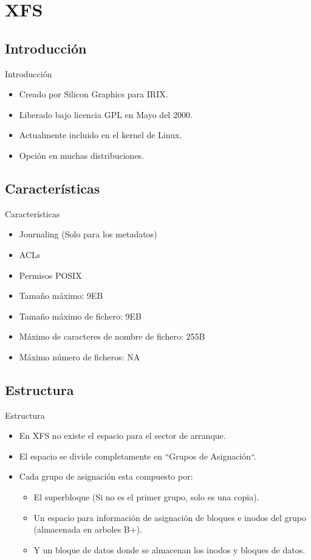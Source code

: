 \section{XFS}
\subsection{Introducción}
\begin{frame}{Introducción}
  \begin{itemize}
    \item Creado por Silicon Graphics para IRIX.
    \item Liberado bajo licencia GPL en Mayo del 2000.
    \item Actualmente incluido en el kernel de Linux.
    \item Opción en muchas distribuciones.
  \end{itemize}
\end{frame}

\subsection{Características}
\begin{frame}{Características}
  \begin{itemize}
    \item Journaling (Solo para los metadatos)
    \item ACLs
    \item Permisos POSIX
    \item Tamaño máximo: 9EB
    \item Tamaño máximo de fichero: 9EB
    \item Máximo de caracteres de nombre de fichero: 255B
    \item Máximo número de ficheros: NA
  \end{itemize}
\end{frame}

\subsection{Estructura}
\begin{frame}{Estructura}
  \begin{itemize}
    \item En XFS no existe el espacio para el sector de arranque.
    \item El espacio se divide completamente en ``Grupos de Asignación``.
    \item Cada grupo de asignación esta compuesto por:
    \begin{itemize}
      \item El superbloque (Si no es el primer grupo, solo es una copia).
      \item Un espacio para información de asignación de bloques e inodos del grupo (almacenada en arboles B+).
      \item Y un bloque de datos donde se almacenan los inodos y bloques de datos.
    \end{itemize}
  \end{itemize}
\end{frame}


